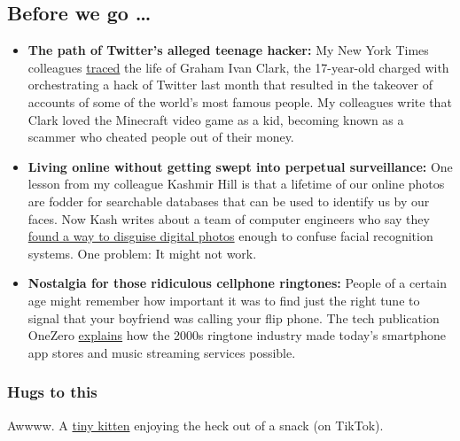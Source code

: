 \hypertarget{before-we-go-}{%
\subsection{Before we go \ldots{}}\label{before-we-go-}}

\begin{itemize}
\item
  \textbf{The path of Twitter's alleged teenage hacker:} My New York
  Times colleagues
  \href{https://www.nytimes.com/2020/08/02/technology/florida-teenager-twitter-hack.html}{traced}
  the life of Graham Ivan Clark, the 17-year-old charged with
  orchestrating a hack of Twitter last month that resulted in the
  takeover of accounts of some of the world's most famous people. My
  colleagues write that Clark loved the Minecraft video game as a kid,
  becoming known as a scammer who cheated people out of their money.
\item
  \textbf{Living online without getting swept into perpetual
  surveillance:} One lesson from my colleague Kashmir Hill is that a
  lifetime of our online photos are fodder for searchable databases that
  can be used to identify us by our faces. Now Kash writes about a team
  of computer engineers who say they
  \href{https://www.nytimes.com/2020/08/03/technology/fawkes-tool-protects-photos-from-facial-recognition.html}{found
  a way to disguise digital photos} enough to confuse facial recognition
  systems. One problem: It might not work.
\item
  \textbf{Nostalgia for those ridiculous cellphone ringtones:} People of
  a certain age might remember how important it was to find just the
  right tune to signal that your boyfriend was calling your flip phone.
  The tech publication OneZero
  \href{https://onezero.medium.com/how-the-custom-ringtone-industry-paved-the-way-for-the-app-store-and-then-vanished-11f0d2a1e53b}{explains}
  how the 2000s ringtone industry made today's smartphone app stores and
  music streaming services possible.
\end{itemize}

\hypertarget{hugs-to-this}{%
\subsubsection{Hugs to this}\label{hugs-to-this}}

Awwww. A
\href{https://www.tiktok.com/@wags_and_whiskers/video/6848325208785341701}{tiny
kitten} enjoying the heck out of a snack (on TikTok).

